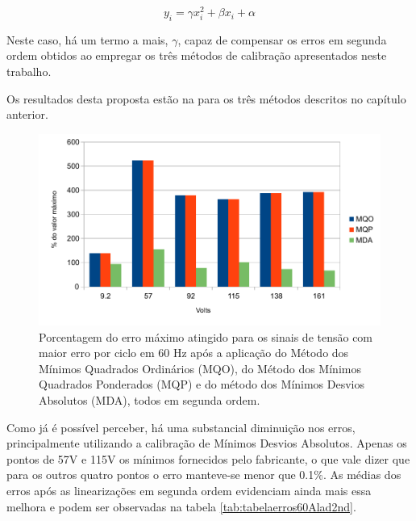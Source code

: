 \begin{equation}\label{eq:sec_order}
y_i = \gamma x_i^2 + \beta x_i + \alpha
\end{equation}

Neste caso, há um termo a mais, $\gamma$, capaz de compensar os erros em segunda ordem obtidos ao empregar os três métodos de calibração apresentados neste trabalho.  

Os resultados desta proposta estão na  para os três métodos descritos no capítulo anterior.

\begin{figure}
    \caption{Porcentagem do erro máximo atingido para os sinais de tensão com maior erro por ciclo em 60 Hz após a aplicação do Método dos Mínimos Quadrados Ordinários (MQO), do Método dos Mínimos Quadrados Ponderados (MQP) e do método dos Mínimos Desvios Absolutos (MDA), todos em segunda ordem.}
    \label{fig:res_volt2nd}
    \centering
    \includegraphics[width=0.9\linewidth]{pictures/max_err_VC_aftercalib60_2nd.pdf}
\end{figure}

Como já é possível perceber, há uma substancial diminuição nos erros, principalmente utilizando a calibração de Mínimos Desvios Absolutos. Apenas os pontos de 57V e 115V os mínimos fornecidos pelo fabricante, o que vale dizer que para os outros quatro pontos o erro manteve-se menor que 0.1$\%$. As médias dos erros após as linearizações em segunda ordem evidenciam ainda mais essa melhora e podem ser observadas na tabela \ref{tab:tabelaerros60Alad2nd}.

